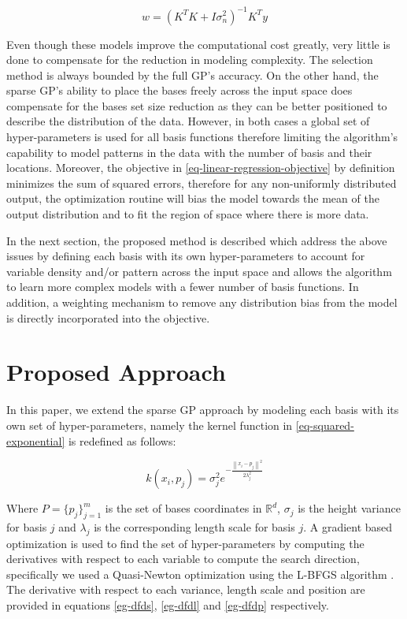 \documentclass[a4paper,12pt]{article}
\begin{document}
\begin{equation}
\label{eq-linear-regression-objective-rectangular}
w = \left(K^{T}K+I\sigma_{n}^{2} \right)^{-1}K^{T}y
\end{equation}

Even though these models improve the computational cost greatly, very little is done to compensate for the reduction in modeling complexity. The selection method is always bounded by the full GP's accuracy. On the other hand, the sparse GP's ability to place the bases freely across the input space does compensate for the bases set size reduction as they can be better positioned to describe the distribution of the data. However, in both cases a global set of hyper-parameters is used for all basis functions therefore limiting the algorithm's capability to model patterns in the data with the number of basis and their locations. Moreover, the objective in \eqref{eq-linear-regression-objective} by definition minimizes the sum of squared errors, therefore for any non-uniformly distributed output, the optimization routine will bias the model towards the mean of the output distribution and to fit the region of space where there is more data.

In the next section, the proposed method is described which address the above issues by defining each basis with its own hyper-parameters to account for variable density and/or pattern across the input space and allows the algorithm to learn more complex models with a fewer number of basis functions. In addition, a weighting mechanism to remove any distribution bias from the model is directly incorporated into the objective.

\section{Proposed Approach}
\label{sec-proposed-approach}

In this paper, we extend the sparse GP approach by modeling each basis with its own set of hyper-parameters, namely the kernel function in \eqref{eq-squared-exponential} is redefined as follows:

\begin{equation}
\label{eq-squared-exponential-extension}
k(x_{i},p_{j}) = \sigma_{j}^{2}e^{-\frac{\left\| x_{i}-p_{j}\right\|^{2}}{2\lambda_{j}^{2}}}
\end{equation}

Where $P=\{p_{j}\}_{j=1}^{m}$ is the set of bases coordinates in $\mathbb{R}^{d}$, $\sigma_{j}$ is the height variance for basis $j$ and $\lambda_{j}$ is the corresponding length scale for basis $j$. A gradient based optimization is used to find the set of hyper-parameters by computing the derivatives with respect to each variable to compute the search direction, specifically we used a Quasi-Newton optimization using the L-BFGS algorithm \cite{}. The derivative with respect to each variance, length scale and position are provided in equations \eqref{eg-dfds}, \eqref{eg-dfdl} and \eqref{eg-dfdp} respectively. 
\end{document}
